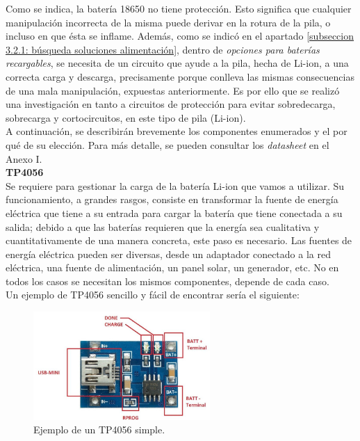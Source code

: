 \documentclass[12pt]{article}
\begin{document}
	\noindent Como se indica, la batería 18650 no tiene protección. Esto significa que cualquier manipulación incorrecta de la misma puede derivar en la rotura de la pila, o incluso en que ésta se inflame.  Además, como se indicó en el apartado \ref{subseccion 3.2.1: búsqueda soluciones alimentación}, dentro de \textit{opciones para baterías recargables}, se necesita de un circuito que ayude a la pila, hecha de Li-ion, a una correcta carga y descarga, precisamente porque conlleva las mismas consecuencias de una mala manipulación, expuestas anteriormente. Es por ello que se realizó una investigación en tanto a circuitos de protección para evitar sobredecarga, sobrecarga y cortocircuitos, en este tipo de pila (Li-ion). \\
	
	\noindent A continuación, se describirán brevemente los componentes enumerados y el por qué de su elección. Para más detalle, se pueden consultar los \textit{datasheet} en el Anexo I. \\
	
	\noindent \textbf{TP4056} \\
	
	\noindent Se requiere para gestionar la carga de la batería Li-ion que vamos a utilizar.  Su funcionamiento, a grandes rasgos, consiste en transformar la fuente de energía eléctrica que tiene a su entrada para cargar la batería que tiene conectada a su salida; debido a que las baterías requieren que la energía sea cualitativa y cuantitativamente de una manera concreta, este paso es necesario. Las fuentes de energía eléctrica pueden ser diversas, desde un adaptador conectado a la red eléctrica, una fuente de alimentación, un panel solar, un generador, etc. No en todos los casos se necesitan los mismos componentes, depende de cada caso.\\
	
	\noindent Un ejemplo de TP4056 sencillo y fácil de encontrar sería el siguiente:  \\
		
	\begin{figure}[h]
		\begin{center}
			\includegraphics[width=0.6\textwidth]{img/tp4056_withoutBoost.png}
			\caption{Ejemplo de un TP4056 simple.}
			\label{TP4056 sin boost}
		\end{center}
	\end{figure}
	
\end{document}
